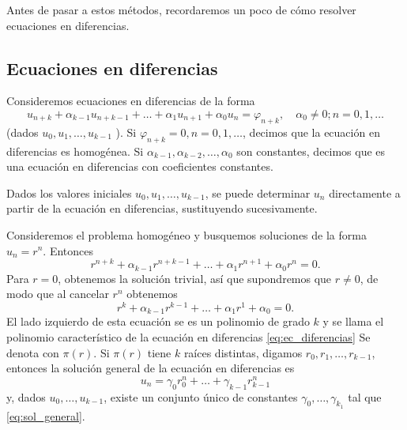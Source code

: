 \documentclass[11pt,letterpaper]{report}
\renewcommand\phi\varphi
\begin{document}
Antes de pasar a estos métodos, recordaremos un poco de cómo resolver
ecuaciones en diferencias.

\subsection{Ecuaciones en diferencias}

Consideremos ecuaciones en diferencias de la forma
\begin{equation}\label{eq:ec_diferencias}
  u_{n+k} + \alpha_{k-1}u_{n+k-1}
  + \dots +
  \alpha_1 u_{n+1}+\alpha_0u_n
  =
  \phi_{n+k},
  \quad \alpha_0 \neq 0; n=0,1,\dots
\end{equation}
(dados $u_0,u_1,\dots,u_{k-1}$ ).
Si $\phi_{n+k}=0,n=0,1,\dots$, decimos que la ecuación en diferencias
es homogénea. Si $\alpha_{k-1},\alpha_{k-2},\dots,\alpha_0$ son
constantes, decimos que es una ecuación en diferencias con
coeficientes constantes.

Dados los valores iniciales $u_0,u_1,\dots,u_{k-1}$, se puede
determinar $u_n$ directamente a partir de la ecuación en diferencias,
sustituyendo sucesivamente.

Consideremos el problema homogéneo y busquemos soluciones de la forma
$u_n=r^{n}$. Entonces
\begin{equation}
  r^{n+k} + \alpha_{k-1}r^{n+k-1}
  + \dots +
  \alpha_1 r^{n+1}+\alpha_0r^n
  =
  0.
\end{equation}
Para $r=0$, obtenemos la solución trivial, así que supondremos que
$r\neq 0$, de modo que al cancelar $r^{n}$ obtenemos
\begin{equation}
  r^{k} + \alpha_{k-1}r^{k-1}
  + \dots +
  \alpha_1 r^{1}+\alpha_0
  =
  0.
\end{equation}
El lado izquierdo de esta ecuación se es un polinomio de grado $k$ y
se llama el polinomio característico de la ecuación en diferencias
\eqref{eq:ec_diferencias} 
Se denota con $\pi(r)$.
Si $\pi(r)$ tiene $k$ raíces distintas, digamos
$r_0,r_1,\dots,r_{k-1}$, entonces la solución general de la ecuación
en diferencias es
\begin{equation}\label{eq:sol_general}
  u_n = \gamma_0r_0^{n} + \dots + \gamma_{k-1}r_{k-1}^{n}
\end{equation}
y, dados $u_0,\dots,u_{k-1}$, existe un conjunto único de constantes
$\gamma_0,\dots,\gamma_{k_1}$ tal que \eqref{eq:sol_general}.
\end{document}
